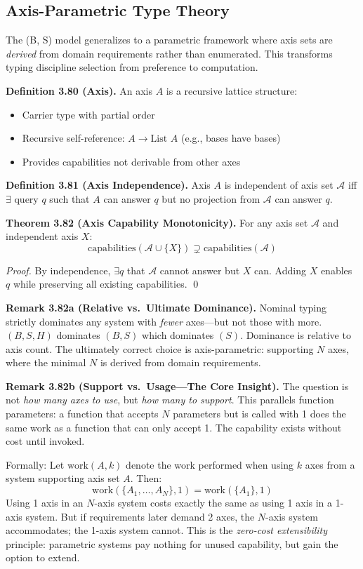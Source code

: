 \subsection{Axis-Parametric Type Theory}\label{axis-parametric-theory}

The (B, S) model generalizes to a parametric framework where axis sets are \emph{derived} from domain requirements rather than enumerated. This transforms typing discipline selection from preference to computation.

\textbf{Definition 3.80 (Axis).} An axis $A$ is a recursive lattice structure:
\begin{itemize}
\item Carrier type with partial order
\item Recursive self-reference: $A \to \text{List } A$ (e.g., bases have bases)
\item Provides capabilities not derivable from other axes
\end{itemize}

\textbf{Definition 3.81 (Axis Independence).} Axis $A$ is independent of axis set $\mathcal{A}$ iff $\exists$ query $q$ such that $A$ can answer $q$ but no projection from $\mathcal{A}$ can answer $q$.

\textbf{Theorem 3.82 (Axis Capability Monotonicity).} For any axis set $\mathcal{A}$ and independent axis $X$:
\[\text{capabilities}(\mathcal{A} \cup \{X\}) \supsetneq \text{capabilities}(\mathcal{A})\]

\emph{Proof.} By independence, $\exists q$ that $\mathcal{A}$ cannot answer but $X$ can. Adding $X$ enables $q$ while preserving all existing capabilities. \qed

\textbf{Remark 3.82a (Relative vs.\ Ultimate Dominance).} Nominal typing strictly dominates any system with \emph{fewer} axes---but not those with more. $(B,S,H)$ dominates $(B,S)$ which dominates $(S)$. Dominance is relative to axis count. The ultimately correct choice is axis-parametric: supporting $N$ axes, where the minimal $N$ is derived from domain requirements.

\textbf{Remark 3.82b (Support vs.\ Usage---The Core Insight).} The question is not \emph{how many axes to use}, but \emph{how many to support}. This parallels function parameters: a function that accepts $N$ parameters but is called with 1 does the same work as a function that can only accept 1. The capability exists without cost until invoked.

Formally: Let $\text{work}(A, k)$ denote the work performed when using $k$ axes from a system supporting axis set $A$. Then:
\[\text{work}(\{A_1, \ldots, A_N\}, 1) = \text{work}(\{A_1\}, 1)\]
Using 1 axis in an $N$-axis system costs exactly the same as using 1 axis in a 1-axis system. But if requirements later demand 2 axes, the $N$-axis system accommodates; the 1-axis system cannot. This is the \emph{zero-cost extensibility} principle: parametric systems pay nothing for unused capability, but gain the option to extend.

